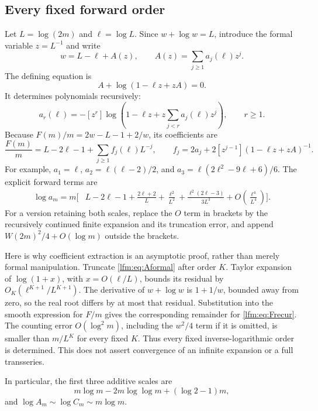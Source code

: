 \documentclass[11pt,letterpaper]{article}
\theoremstyle{remark}\newtheorem{remark}[theorem]{Remark}
\newcommand{\co}[2]{[#1^{#2}]}
\begin{document}
\subsection{Every fixed forward order}
Let $L=\log(2m)$ and $\ell=\log L$. Since $w+\log w=L$, introduce the formal variable $z=L^{-1}$ and write
\[
 w=L-\ell+A(z),\qquad A(z)=\sum_{j\ge1}a_j(\ell)z^j.
\]
The defining equation is
\begin{equation}
 A+\log(1-\ell z+zA)=0.\label{lfm:eq:Aformal}
\end{equation}
It determines polynomials recursively:
\begin{equation}
 a_r(\ell)=-\co zr\log\left(1-\ell z+
 z\sum_{j<r}a_j(\ell)z^j\right),\qquad r\ge1.\label{lfm:eq:Arecur}
\end{equation}
Because $F(m)/m=2w-L-1+2/w$, its coefficients are
\begin{equation}
 \frac{F(m)}m=L-2\ell-1+\sum_{j\ge1}f_j(\ell)L^{-j},\qquad
 f_j=2a_j+2\co z{j-1}(1-\ell z+zA)^{-1}.\label{lfm:eq:Frecur}
\end{equation}
For example, $a_1=\ell$, $a_2=\ell(\ell-2)/2$, and
$a_3=\ell(2\ell^2-9\ell+6)/6$. The explicit forward terms are
\begin{align}
 \log a_m=m\bigg[&L-2\ell-1+\frac{2\ell+2}{L}
 +\frac{\ell^2}{L^2}+\frac{\ell^2(2\ell-3)}{3L^3}
 +O\left(\frac{\ell^4}{L^4}\right)\bigg].\label{lfm:eq:forward}
\end{align}
For a version retaining both scales, replace the $O$ term in brackets by the recursively continued finite expansion and its truncation error, and append $W(2m)^2/4+O(\log m)$ outside the brackets.

Here is why coefficient extraction is an asymptotic proof, rather than merely formal manipulation. Truncate \eqref{lfm:eq:Aformal} after order $K$. Taylor expansion of $\log(1+x)$, with $x=O(\ell/L)$, bounds its residual by $O_K(\ell^{K+1}/L^{K+1})$. The derivative of $w+\log w$ is $1+1/w$, bounded away from zero, so the real root differs by at most that residual. Substitution into the smooth expression for $F/m$ gives the corresponding remainder for \eqref{lfm:eq:Frecur}. The counting error $O(\log^2m)$, including the $w^2/4$ term if it is omitted, is smaller than $m/L^K$ for every fixed $K$. Thus every fixed inverse-logarithmic order is determined. This does not assert convergence of an infinite expansion or a full transseries.

In particular, the first three additive scales are
\[
 m\log m-2m\log\log m+(\log2-1)m,
\]
and $\log A_m\sim\log C_m\sim m\log m$.
\end{document}

